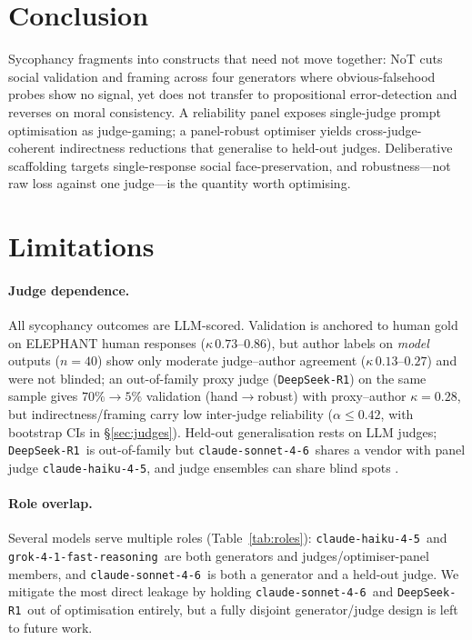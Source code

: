 \documentclass[11pt]{article}
\newcommand{\haiku}{\texttt{claude-haiku-4-5}}
\newcommand{\sonnet}{\texttt{claude-sonnet-4-6}}
\newcommand{\grok}{\texttt{grok-4-1-fast-reasoning}}
\newcommand{\deepseek}{\texttt{DeepSeek-R1}}
\begin{document}
\section{Conclusion}
Sycophancy fragments into constructs that need not move together: NoT cuts social validation and framing
across four generators where obvious-falsehood probes show no signal, yet does not transfer to
propositional error-detection and reverses on moral consistency. A reliability panel exposes
single-judge prompt optimisation as judge-gaming; a panel-robust optimiser yields
cross-judge-coherent indirectness reductions that generalise to held-out judges. Deliberative scaffolding
targets single-response social face-preservation, and robustness---not raw loss against one judge---is
the quantity worth optimising.

\section*{Limitations}
\label{sec:limitations}
\paragraph{Judge dependence.}
All sycophancy outcomes are LLM-scored. Validation is anchored to human gold on ELEPHANT human responses
($\kappa\,0.73$--$0.86$), but author labels on \emph{model} outputs ($n{=}40$) show only moderate
judge--author agreement ($\kappa\,0.13$--$0.27$) and were not blinded; an out-of-family proxy judge
(\deepseek) on the same sample gives $70\%\rightarrow5\%$ validation (hand$\rightarrow$robust) with
proxy--author $\kappa{=}0.28$, but indirectness/framing carry low inter-judge reliability
($\alpha\leq0.42$, with bootstrap CIs in \S\ref{sec:judges}). Held-out generalisation rests on LLM
judges; \deepseek\ is out-of-family but \sonnet\ shares a vendor with panel judge \haiku, and judge
ensembles can share blind spots \citep{eisenstein23herding}.

\paragraph{Role overlap.}
Several models serve multiple roles (Table~\ref{tab:roles}): \haiku\ and \grok\ are both generators and
judges/optimiser-panel members, and \sonnet\ is both a generator and a held-out judge. We mitigate the
most direct leakage by holding \sonnet\ and \deepseek\ out of optimisation entirely, but a fully
disjoint generator/judge design is left to future work.
\end{document}
